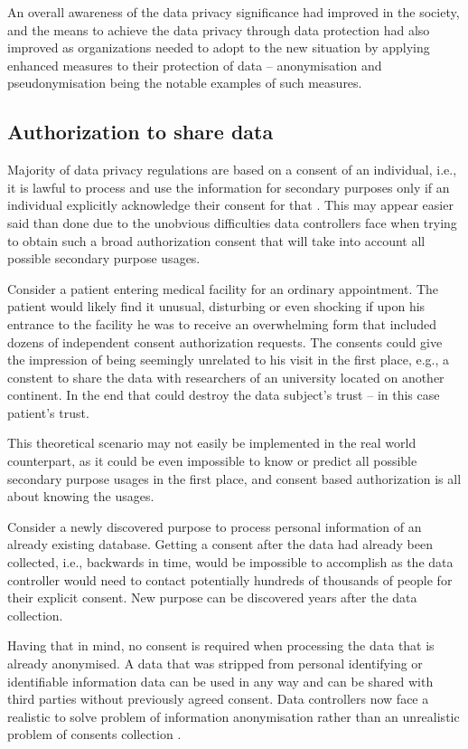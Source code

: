 \documentclass[a4paper,twoside,12pt]{book}
\begin{document}
An overall awareness of the data privacy significance had improved in the society, and the means to achieve the data privacy through data protection had also improved as organizations needed to adopt to the new situation by applying enhanced measures to their protection of data – anonymisation and pseudonymisation being the notable examples of such measures.

\subsection{Authorization to share data}
Majority of data privacy regulations are based on a consent of an individual, i.e., it is lawful to process and use the information for secondary purposes only if an individual explicitly acknowledge their consent for that \cite{bib:gdpr_practical_guide}. This may appear easier said than done due to the unobvious difficulties data controllers face when trying to obtain such a broad authorization consent that will take into account all possible secondary purpose usages.

Consider a patient entering medical facility for an ordinary appointment. The patient would likely find it unusual, disturbing or even shocking if upon his entrance to the facility he was to receive an overwhelming form that included dozens of independent consent authorization requests. The consents could give the impression of being seemingly unrelated to his visit in the first place, e.g., a constent to share the data with researchers of an university located on another continent. In the end that could destroy the data subject's trust – in this case patient's trust.

This theoretical scenario may not easily be implemented in the real world counterpart, as it could be even impossible to know or predict all possible secondary purpose usages in the first place, and consent based authorization is all about knowing the usages.

Consider a newly discovered purpose to process personal information of an already existing database. Getting a consent after the data had already been collected, i.e., backwards in time, would be impossible to accomplish as the data controller would need to contact potentially hundreds of thousands of people for their explicit consent. New purpose can be discovered years after the data collection.

Having that in mind, no consent is required when processing the data that is already anonymised. A data that was stripped from personal identifying or identifiable information data can be used in any way and can be shared with third parties without previously agreed consent. Data controllers now face a realistic to solve problem of information anonymisation rather than an unrealistic problem of consents collection \cite{bib:anonymizing_health_data}.
\end{document}
